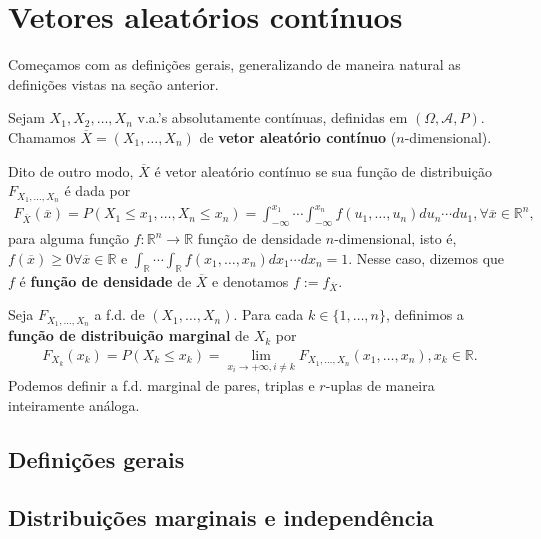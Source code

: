 \documentclass[../Notas.tex]{subfiles}
\begin{document}
\section{Vetores aleatórios contínuos}
Começamos com as definições gerais, generalizando de maneira natural as definições vistas na seção anterior.
\begin{definition}
Sejam $X_1, X_2, \dots, X_n$ v.a.'s absolutamente contínuas, definidas em $(\Omega, \mathcal{A}, P)$. Chamamos $\overline{X} = (X_1, \dots, X_n)$ de \textbf{vetor aleatório contínuo} ($n$-dimensional).

Dito de outro modo, $\overline{X}$ é vetor aleatório contínuo se sua função de distribuição $F_{X_1, \dots, X_n}$ é dada por
\begin{align*}
    F_{\overline{X}}(\overline{x}) = P(X_1\leq x_1, \dots, X_n\leq x_n) = \int_{-\infty}^{x_1}\cdots\int_{-\infty}^{x_n} f(u_1, \dots, u_n) du_n\cdots du_1, \forall \overline{x}\in\mathbb{R}^n,
\end{align*}
para alguma função $f:\mathbb{R}^n\to\mathbb{R}$ função de densidade $n$-dimensional, isto é, $f(\overline{x}) \geq 0 \forall\overline{x}\in\mathbb{R}$ e $\displaystyle{ \int_{\mathbb{R}} \cdots \int_{\mathbb{R}} f(x_1, \dots, x_n) dx_1\cdots dx_n = 1 }$. Nesse caso, dizemos que $f$ é \textbf{função de densidade} de $\overline{X}$ e denotamos $f:= f_{\overline{X}}$.
\end{definition}

\begin{definition}
Seja $F_{X_1, \dots, X_n}$ a f.d. de $(X_1, \dots, X_n)$. Para cada $k\in\{1,\dots,n\}$, definimos a \textbf{função de distribuição marginal} de $X_k$ por
\begin{align*}
    F_{X_k}(x_k) = P(X_k\leq x_k) = \lim_{x_i\to +\infty, i\neq k} F_{X_1, \dots, X_n}(x_1, \dots, x_n), x_k\in\mathbb{R}.
\end{align*}
Podemos definir a f.d. marginal de pares, triplas e $r$-uplas de maneira inteiramente análoga.
\end{definition}




\subsection{Definições gerais}

\subsection{Distribuições marginais e independência}
\end{document}
